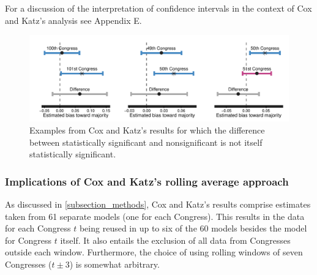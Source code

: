 For a discussion of the interpretation of confidence intervals in the context of Cox and Katz's analysis 
see Appendix E. %

\begin{figure}
\centering
\includegraphics[scale=0.75]{sections/figs/ck_signif_all}%
\caption{Examples from Cox and Katz's results for which the difference between statistically 
significant and nonsignificant is not itself statistically significant.}
\label{fig:ck_signif}
\end{figure}

\subsubsection{Implications of Cox and Katz's rolling average approach}

As discussed in \ref{subsection_methods}, Cox and Katz's results comprise estimates taken 
from 61 separate models (one for each Congress). This results in the data for each Congress 
$t$ being reused in up to six of the 60 models besides the model for Congress $t$ itself. It also 
entails the exclusion of all data from Congresses outside each window. Furthermore, the 
choice of using rolling windows of seven Congresses ($t \pm 3$) is somewhat arbitrary. 

